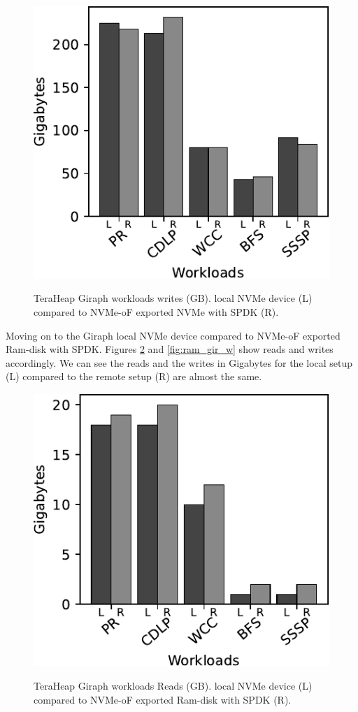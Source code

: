 \begin{figure}[H]
  \includegraphics[width=\linewidth]{figures/giraph_w.pdf}\\
\caption{TeraHeap Giraph workloads writes (GB). local NVMe device (L) compared to NVMe-oF exported NVMe with SPDK (R).}
\label{fig:giraph_w}
\end{figure}
 Moving on to the Giraph local NVMe device compared to NVMe-oF exported Ram-disk with SPDK. Figures \ref{fig:ram_gir_r} and \ref{fig:ram_gir_w} show reads and
 writes accordingly. We can see the reads and the writes in Gigabytes for the local setup (L) compared to the remote setup (R) are almost the same.
\begin{figure}[H]
  \includegraphics[width=\linewidth]{figures/ram_gir_r.pdf}\\
\caption{TeraHeap Giraph workloads Reads (GB). local NVMe device (L) compared to NVMe-oF exported Ram-disk with SPDK (R).}
\label{fig:ram_gir_r}
\end{figure}

